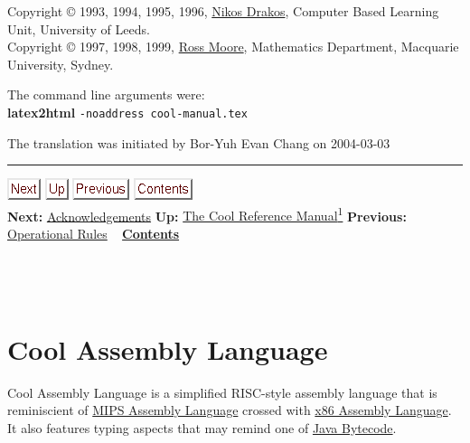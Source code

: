 \documentclass[]{article}
\begin{document}
Copyright © 1993, 1994, 1995, 1996,
\href{http://cbl.leeds.ac.uk/nikos/personal.html}{Nikos Drakos},
Computer Based Learning Unit, University of Leeds. \\ Copyright © 1997,
1998, 1999, \href{http://www.maths.mq.edu.au/~ross/}{Ross Moore},
Mathematics Department, Macquarie University, Sydney.

The command line arguments were: \\ \textbf{latex2html}
\texttt{-noaddress cool-manual.tex}

The translation was initiated by Bor-Yuh Evan Chang on 2004-03-03 \\

\begin{center}\rule{3in}{0.4pt}\end{center}

\href{node33.html}{\includegraphics{next.png}}
\href{cool-manual.html}{\includegraphics{up.png}}
\href{node31.html}{\includegraphics{prev.png}}
\href{node1.html}{\includegraphics{contents.png}} \\ \textbf{Next:}
\href{node49.html}{Acknowledgements} \textbf{Up:}
\href{cool-manual.html}{The Cool Reference Manual\textsuperscript{1}}
\textbf{Previous:} \href{node48.html}{Operational Rules} ~
\textbf{\href{node1.html}{Contents}} \\ \\

\section{\\ Cool Assembly Language}

Cool Assembly Language is a simplified RISC-style assembly language that
is reminiscient of
\href{http://en.wikipedia.org/wiki/MIPS_architecture\#MIPS_assembly_language}{MIPS
Assembly Language} crossed with
\href{http://en.wikipedia.org/wiki/X86_assembly_language}{x86 Assembly
Language}. It also features typing aspects that may remind one of
\href{http://en.wikipedia.org/wiki/Java_bytecode}{Java Bytecode}.
\end{document}
